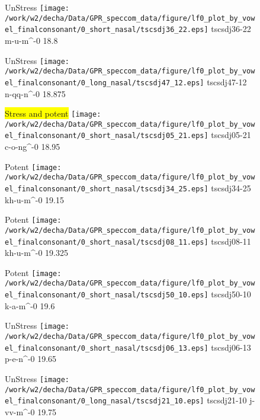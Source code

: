 \documentclass{article}
\begin{document}
\begin{figure}[t]
\begin{minipage}[b]{.24\textwidth}
UnStress
\centering
\texttt{[image: /work/w2/decha/Data/GPR\_speccom\_data/figure/lf0\_plot\_by\_vowel\_finalconsonant/0\_short\_nasal/tscsdj36\_22.eps]}
tscsdj36-22 m-u-m\textasciicircum-0 18.8
\end{minipage}
\begin{minipage}[b]{.24\textwidth}
UnStress
\centering
\texttt{[image: /work/w2/decha/Data/GPR\_speccom\_data/figure/lf0\_plot\_by\_vowel\_finalconsonant/0\_long\_nasal/tscsdj47\_12.eps]}
tscsdj47-12 n-qq-n\textasciicircum-0 18.875
\end{minipage}
\begin{minipage}[b]{.24\textwidth}
\colorbox{yellow}{Stress and potent}
\centering
\texttt{[image: /work/w2/decha/Data/GPR\_speccom\_data/figure/lf0\_plot\_by\_vowel\_finalconsonant/0\_short\_nasal/tscsdj05\_21.eps]}
tscsdj05-21 c-o-ng\textasciicircum-0 18.95
\end{minipage}
\begin{minipage}[b]{.24\textwidth}
\colorbox{Apricot}{Potent}
\centering
\texttt{[image: /work/w2/decha/Data/GPR\_speccom\_data/figure/lf0\_plot\_by\_vowel\_finalconsonant/0\_short\_nasal/tscsdj34\_25.eps]}
tscsdj34-25 kh-u-m\textasciicircum-0 19.15
\end{minipage}
\end{figure}

\begin{figure}[t]
\begin{minipage}[b]{.24\textwidth}
\colorbox{Apricot}{Potent}
\centering
\texttt{[image: /work/w2/decha/Data/GPR\_speccom\_data/figure/lf0\_plot\_by\_vowel\_finalconsonant/0\_short\_nasal/tscsdj08\_11.eps]}
tscsdj08-11 kh-u-m\textasciicircum-0 19.325
\end{minipage}
\begin{minipage}[b]{.24\textwidth}
\colorbox{Apricot}{Potent}
\centering
\texttt{[image: /work/w2/decha/Data/GPR\_speccom\_data/figure/lf0\_plot\_by\_vowel\_finalconsonant/0\_short\_nasal/tscsdj50\_10.eps]}
tscsdj50-10 k-a-m\textasciicircum-0 19.6
\end{minipage}
\begin{minipage}[b]{.24\textwidth}
UnStress
\centering
\texttt{[image: /work/w2/decha/Data/GPR\_speccom\_data/figure/lf0\_plot\_by\_vowel\_finalconsonant/0\_short\_nasal/tscsdj06\_13.eps]}
tscsdj06-13 p-e-n\textasciicircum-0 19.65
\end{minipage}
\begin{minipage}[b]{.24\textwidth}
UnStress
\centering
\texttt{[image: /work/w2/decha/Data/GPR\_speccom\_data/figure/lf0\_plot\_by\_vowel\_finalconsonant/0\_long\_nasal/tscsdj21\_10.eps]}
tscsdj21-10 j-vv-m\textasciicircum-0 19.75
\end{minipage}
\end{figure}
\end{document}
